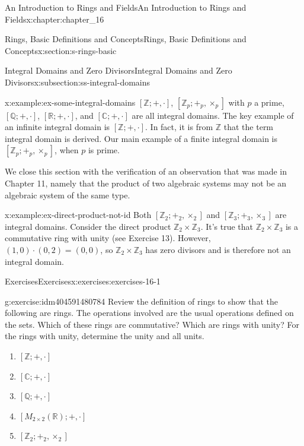\documentclass[twoside,10pt,]{book}
\numberwithin{equation}{section}
\begin{document}
\begin{chapterptx}{An Introduction to Rings and Fields}{}{An Introduction to Rings and Fields}{}{}{x:chapter:chapter_16}
\begin{sectionptx}{Rings, Basic Definitions and Concepts}{}{Rings, Basic Definitions and Concepts}{}{}{x:section:s-rings-basic}
\begin{subsectionptx}{Integral Domains and Zero Divisors}{}{Integral Domains and Zero Divisors}{}{}{x:subsection:ss-integral-domains}
\begin{example}{}{x:example:ex-some-integral-domains}
\([\mathbb{Z}; +, \cdot]\), \(\left[\mathbb{Z}_p; +_p , \times_p \right]\) with \(p\) a prime, \([\mathbb{Q}; +, \cdot ]\), \([\mathbb{R}; +, \cdot ]\), and \([\mathbb{C}; +, \cdot ]\) are all integral domains. The key example of an infinite integral domain is \([\mathbb{Z}; +, \cdot ]\). In fact, it is from \(\mathbb{Z}\) that the term integral domain is derived. Our main example of a finite integral domain is \(\left[\mathbb{Z}_p; +_p , \times_p \right]\), when \(p\) is prime.%
\end{example}
We close this section with the verification of an observation that was made in Chapter 11, namely that the product of two algebraic systems may not be an algebraic system of the same type.%
\begin{example}{}{x:example:ex-direct-product-not-id}%
Both \(\left[\mathbb{Z}_2; +_2 , \times_2 \right]\) and \(\left[\mathbb{Z}_3; +_3 , \times_3 \right]\) are integral domains. Consider the direct product \(\mathbb{Z}_2\times \mathbb{Z}_3\). It's true that  \(\mathbb{Z}_2 \times \mathbb{Z}_3\) is a commutative ring with unity (see Exercise 13).  However, \((1,0)\cdot  (0, 2) = (0, 0)\), so \(\mathbb{Z}_2\times \mathbb{Z}_3\) has zero divisors and is therefore not an integral domain.%
\end{example}
\end{subsectionptx}
%
%
\typeout{************************************************}
\typeout{************************************************}
%
\begin{exercises-subsection}{Exercises}{}{Exercises}{}{}{x:exercises:exercises-16-1}
\begin{divisionexercise}{1}{}{}{g:exercise:idm404591480784}%
Review the definition of rings to show that the following are rings. The operations involved are the usual operations defined on the sets. Which of these rings are commutative? Which are rings with unity? For the rings with unity, determine the unity and all units.%
\begin{enumerate}[label=(\alph*)]
\item{}\([\mathbb{Z};+,\cdot ]\)%
\item{}\([\mathbb{C};+,\cdot ]\)%
\item{}\([\mathbb{Q};+,\cdot ]\)%
\item{}\(\left[M_{2\times 2}(\mathbb{R});+, \cdot \right]\)%
\item{}\(\left[\mathbb{Z}_2;+_2,\times_2\right]\)%
\end{enumerate}
%
\end{divisionexercise}%

\end{exercises-subsection}
\end{sectionptx}
\end{chapterptx}
\end{document}
